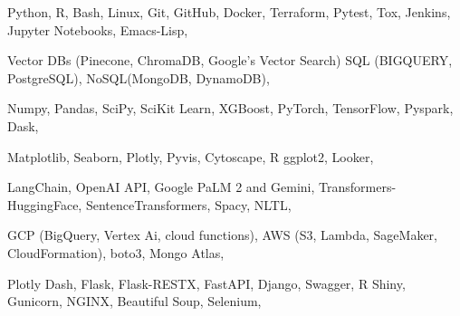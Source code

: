 


\begin{cvskills}


{
Python, R, Bash, Linux, Git, GitHub, Docker, Terraform, Pytest, Tox, Jenkins, Jupyter Notebooks, Emacs-Lisp,
}

{
Vector DBs (Pinecone, ChromaDB, Google's Vector Search) SQL (BIGQUERY, PostgreSQL), NoSQL(MongoDB, DynamoDB),
}

{
Numpy, Pandas, SciPy, SciKit Learn, XGBoost, PyTorch, TensorFlow, Pyspark, Dask,
}

{
Matplotlib, Seaborn, Plotly, Pyvis, Cytoscape, R ggplot2, Looker,
}

{
LangChain, OpenAI API, Google PaLM 2 and Gemini, Transformers-HuggingFace, SentenceTransformers, Spacy, NLTL, 
}

{
GCP (BigQuery, Vertex Ai, cloud functions), AWS (S3, Lambda, SageMaker, CloudFormation), boto3, Mongo Atlas,
}

{
Plotly Dash, Flask, Flask-RESTX, FastAPI, Django, Swagger, R Shiny, Gunicorn, NGINX, Beautiful Soup, Selenium,
}






\end{cvskills}
